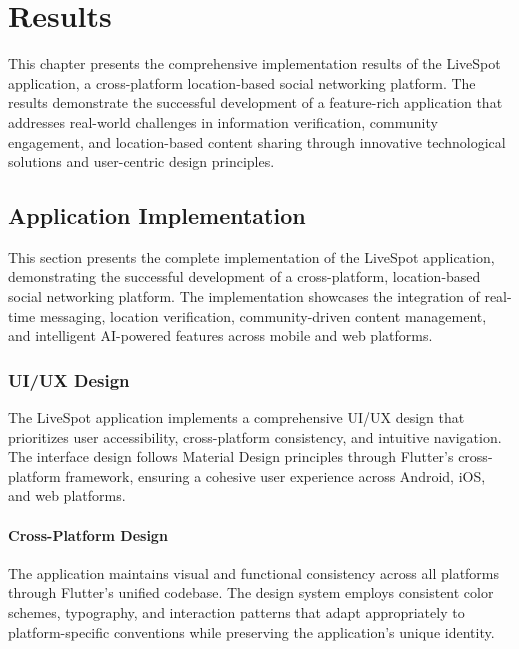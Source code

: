 \chapter{Results}\label{ch:results}

This chapter presents the comprehensive implementation results of the LiveSpot application, a cross-platform location-based social networking platform. The results demonstrate the successful development of a feature-rich application that addresses real-world challenges in information verification, community engagement, and location-based content sharing through innovative technological solutions and user-centric design principles.

\section{Application Implementation}\label{sec:app_implementation}

This section presents the complete implementation of the LiveSpot application, demonstrating the successful development of a cross-platform, location-based social networking platform. The implementation showcases the integration of real-time messaging, location verification, community-driven content management, and intelligent AI-powered features across mobile and web platforms.

\subsection{UI/UX Design}\label{subsec:ui_ux_design}

The LiveSpot application implements a comprehensive UI/UX design that prioritizes user accessibility, cross-platform consistency, and intuitive navigation. The interface design follows Material Design principles through Flutter's cross-platform framework, ensuring a cohesive user experience across Android, iOS, and web platforms.

\subsubsection{Cross-Platform Design}\label{subsubsec:cross_platform_design}

The application maintains visual and functional consistency across all platforms through Flutter's unified codebase. The design system employs consistent color schemes, typography, and interaction patterns that adapt appropriately to platform-specific conventions while preserving the application's unique identity.

